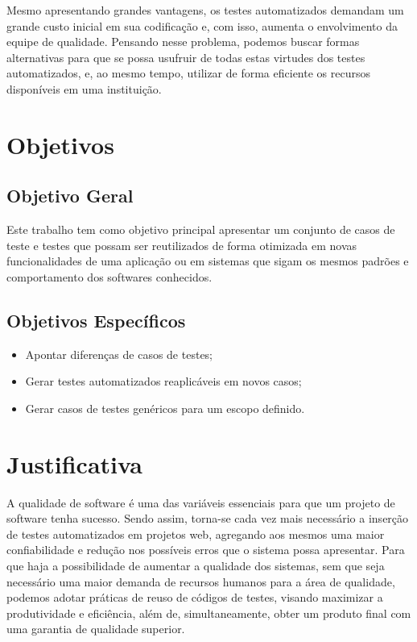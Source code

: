 \documentclass[tg]{mdtufsm}
\begin{document}
Mesmo apresentando grandes vantagens, os testes automatizados demandam um grande custo inicial em sua codificação e, com isso, aumenta o
envolvimento da equipe de qualidade. Pensando nesse problema, podemos buscar formas alternativas para
que se possa usufruir de todas estas virtudes dos testes automatizados, e, ao mesmo tempo, utilizar de forma eficiente os
recursos disponíveis em uma instituição.

\section{Objetivos}

\subsection{Objetivo Geral}

Este trabalho tem como objetivo principal apresentar um conjunto de casos de teste e testes que possam ser reutilizados de
forma otimizada em novas funcionalidades de uma aplicação ou em sistemas que sigam os mesmos padrões e comportamento dos
softwares conhecidos.

\subsection{Objetivos Específicos}
\begin{itemize}
	\item Apontar diferenças de casos de testes;
    \item Gerar testes automatizados reaplicáveis em novos casos;
    \item Gerar casos de testes genéricos para um escopo definido.
\end{itemize}

\section{Justificativa}

A qualidade de software  é uma das variáveis essenciais para que um projeto de software tenha sucesso.
Sendo assim, torna-se cada vez mais necessário a inserção de testes automatizados em projetos web,
agregando aos mesmos uma maior confiabilidade e redução nos possíveis erros que o sistema possa
apresentar. Para que haja a possibilidade de aumentar a qualidade dos sistemas, sem que seja necessário uma maior
demanda de recursos humanos para a área de qualidade, podemos adotar práticas de reuso de códigos de testes, visando
maximizar a produtividade e eficiência, além de, simultaneamente, obter um produto final com uma garantia de qualidade
superior.
\end{document}
